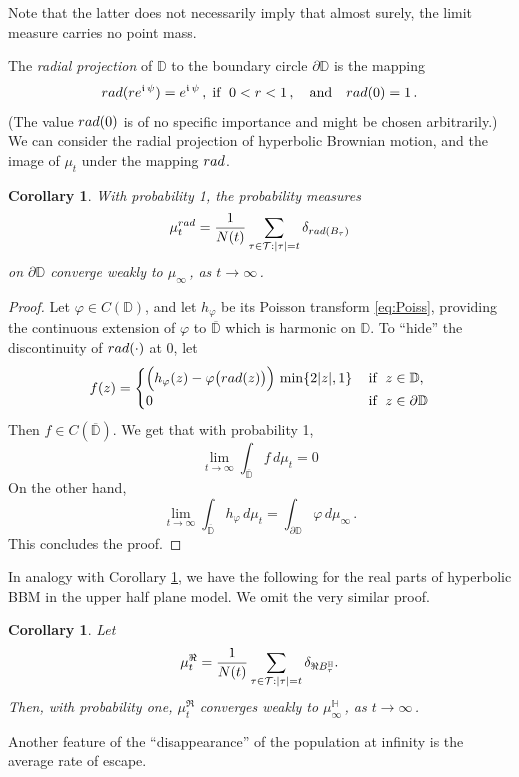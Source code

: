 \documentclass[12pt]{amsart}
\newcommand\AND{\quad\text{and}\quad}
\newcommand\BB{\textit{\textbf{B}}}
\newcommand\DD{\mathbb D}
\newcommand\HH{\mathbb H}
\newcommand\im{\mathfrak{i}\,}
\newcommand\nn{N}
\newcommand\rad{\textsl{rad}}
\newcommand\T{\mathcal T}
\numberwithin{theorem}{section}
\newtheorem{cor}[theorem]{Corollary}%
\theoremstyle{definition}
\begin{document}
Note that the latter does not necessarily imply that almost surely, the limit measure carries
no point mass.

The \emph{radial projection} of $\DD$ to the boundary circle $\partial \DD$
is the mapping 
$$
\rad(r e^{\im\psi}) =  e^{\im\psi}\,, \; \text {if }\; 0 < r< 1\,, \AND 
\rad(0) = 1\,.
$$
(The value $\rad(0)$ is of no specific importance and might be chosen arbitrarily.)
We can consider the radial projection of hyperbolic Brownian motion, and the image
of $\mu_t$ under the mapping $\rad$.

\begin{cor}\label{cor:rad}
With probability 1, the probability measures 
$$
\mu_t^{\rad} = \frac{1}{\nn(t)}\sum_{\tau \in \T: |\tau| = t} \delta_{\rad(\BB_{\tau})}
$$
on $\partial \DD$ converge weakly to $\mu_{\infty}\,$, as $t \to \infty\,$. 
\end{cor}

\begin{proof} Let $\varphi \in C(\DD)$, and let $h_{\varphi}$ be its Poisson transform 
\eqref{eq:Poiss}, providing the continuous extension of $\varphi$ to $\overline{\DD}$
which is harmonic on $\DD$. To ``hide'' the discontinuity of $\rad(\cdot)$ at $0$, let
$$
f(z) = \begin{cases}     
\Bigl( h_{\varphi}(z) - \varphi\bigl(\rad(z)\bigr)\Bigr)\, \min \{2|z|, 1\}\,&\text{if }\; z \in \DD,\\
0\,&\text{if }\; z \in \partial\DD
\end{cases}
$$
Then $f \in C(\overline{\DD})$. We get that with probability 1,
$$
\lim_{t \to \infty} \int_{\overline{\DD}} f\, d\mu_t = 0
$$
On the other hand,  
$$
\lim_{t \to \infty} \int_{\overline{\DD}} h_{\varphi}\, d\mu_t 
=  \int_{\partial\DD} \varphi\, d\mu_{\infty}\,.
$$
This concludes the proof.
\end{proof}

In analogy with Corollary \ref{cor:rad},
we have the following for the real parts of hyperbolic BBM in the upper half 
plane model. We omit the very similar proof.

\begin{cor}\label{cor:realpart}  Let
$$
\mu_t^{\Re} 
= \frac{1}{\nn(t)}\sum_{\tau \in \T: |\tau| = t} \delta_{\Re\BB_{\tau}^{\HH}}.
$$
Then, with probability one, $\mu_t^{\Re}$ converges weakly to  
$\mu_{\infty}^{\HH}\,$, as $t \to \infty\,$. 
\end{cor}

Another feature of the ``disappearance'' of the population at infinity 
is the average rate of escape.
\end{document}
